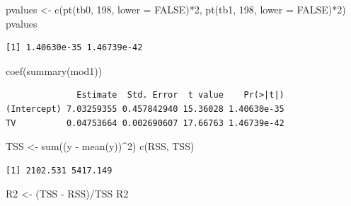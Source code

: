 \documentclass[
]{article}
\newenvironment{Shaded}{\begin{snugshade}}{\end{snugshade}}
\newcommand{\AttributeTok}[1]{\textcolor[rgb]{0.77,0.63,0.00}{#1}}
\newcommand{\ConstantTok}[1]{\textcolor[rgb]{0.00,0.00,0.00}{#1}}
\newcommand{\DecValTok}[1]{\textcolor[rgb]{0.00,0.00,0.81}{#1}}
\newcommand{\FunctionTok}[1]{\textcolor[rgb]{0.00,0.00,0.00}{#1}}
\newcommand{\NormalTok}[1]{#1}
\newcommand{\OtherTok}[1]{\textcolor[rgb]{0.56,0.35,0.01}{#1}}
\newcommand{\SpecialCharTok}[1]{\textcolor[rgb]{0.00,0.00,0.00}{#1}}
\begin{document}
\begin{Shaded}
\begin{Highlighting}[]
\NormalTok{pvalues }\OtherTok{\textless{}{-}} \FunctionTok{c}\NormalTok{(}\FunctionTok{pt}\NormalTok{(tb0, }\DecValTok{198}\NormalTok{, }\AttributeTok{lower =} \ConstantTok{FALSE}\NormalTok{)}\SpecialCharTok{*}\DecValTok{2}\NormalTok{, }\FunctionTok{pt}\NormalTok{(tb1, }\DecValTok{198}\NormalTok{, }\AttributeTok{lower =} \ConstantTok{FALSE}\NormalTok{)}\SpecialCharTok{*}\DecValTok{2}\NormalTok{)}
\NormalTok{pvalues}
\end{Highlighting}
\end{Shaded}

\begin{verbatim}
[1] 1.40630e-35 1.46739e-42
\end{verbatim}

\begin{Shaded}
\begin{Highlighting}[]
\FunctionTok{coef}\NormalTok{(}\FunctionTok{summary}\NormalTok{(mod1))}
\end{Highlighting}
\end{Shaded}

\begin{verbatim}
              Estimate  Std. Error  t value    Pr(>|t|)
(Intercept) 7.03259355 0.457842940 15.36028 1.40630e-35
TV          0.04753664 0.002690607 17.66763 1.46739e-42
\end{verbatim}

\begin{Shaded}
\begin{Highlighting}[]
\NormalTok{TSS }\OtherTok{\textless{}{-}} \FunctionTok{sum}\NormalTok{((y }\SpecialCharTok{{-}} \FunctionTok{mean}\NormalTok{(y))}\SpecialCharTok{\^{}}\DecValTok{2}\NormalTok{)}
\FunctionTok{c}\NormalTok{(RSS, TSS)}
\end{Highlighting}
\end{Shaded}

\begin{verbatim}
[1] 2102.531 5417.149
\end{verbatim}

\begin{Shaded}
\begin{Highlighting}[]
\NormalTok{R2 }\OtherTok{\textless{}{-}}\NormalTok{ (TSS }\SpecialCharTok{{-}}\NormalTok{ RSS)}\SpecialCharTok{/}\NormalTok{TSS}
\NormalTok{R2}
\end{Highlighting}
\end{Shaded}
\end{document}
